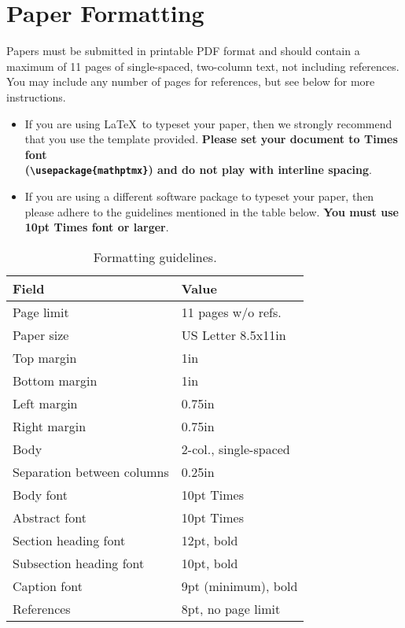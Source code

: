 \documentclass{sig-alternate}
\begin{document}
\section{Paper Formatting}

Papers must be submitted in printable PDF format and should contain a maximum of 11 pages of single-spaced, two-column text, not including references. You may include any number of pages for references, but see below for more instructions.

\begin{itemize}

\item If you are using \LaTeX~\cite{lamport94}to typeset your paper, then we strongly recommend that you use the template provided. \textbf{Please set your document to Times font \\ (\texttt{\textbackslash usepackage\{mathptmx\}}) and do not play with interline spacing}.

\item If you are using a different software package to typeset your paper, then please adhere to the guidelines mentioned in the table below. \textbf{You must use 10pt Times font or larger}.

\end{itemize}

\begin{table}[h]
\caption{Formatting guidelines.}

\begin{tabular}{ll}
\hline
Field &
Value \\
\hline
Page limit &
11 pages w/o refs. \\
Paper size &
US Letter 8.5x11in \\
Top margin &
1in \\
Bottom margin &
1in \\
Left margin &
0.75in \\
Right margin &
0.75in \\
Body &
2-col., single-spaced \\
Separation between columns &
0.25in \\
Body font &
10pt Times \\
Abstract font &
10pt Times \\
Section heading font &
12pt, bold \\
Subsection heading font &
10pt, bold \\
Caption font &
9pt (minimum), bold \\
References &
8pt, no page limit \\
\hline
\end{tabular}

\end{table}
\end{document}
